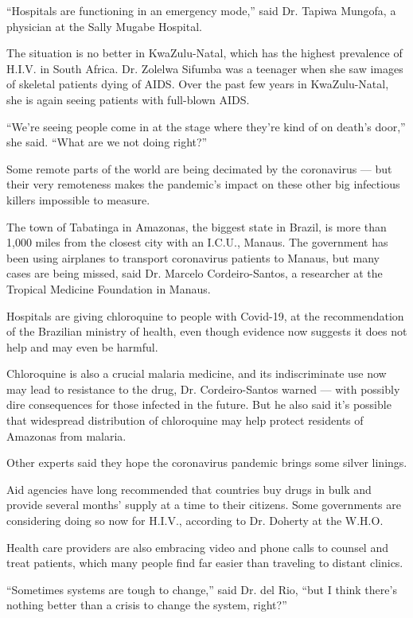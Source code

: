 ``Hospitals are functioning in an emergency mode,'' said Dr. Tapiwa
Mungofa, a physician at the Sally Mugabe Hospital.

The situation is no better in KwaZulu-Natal, which has the highest
prevalence of H.I.V. in South Africa. Dr. Zolelwa Sifumba was a teenager
when she saw images of skeletal patients dying of AIDS. Over the past
few years in KwaZulu-Natal, she is again seeing patients with full-blown
AIDS.

``We're seeing people come in at the stage where they're kind of on
death's door,'' she said. ``What are we not doing right?''

Some remote parts of the world are being decimated by the coronavirus
--- but their very remoteness makes the pandemic's impact on these other
big infectious killers impossible to measure.

The town of Tabatinga in Amazonas, the biggest state in Brazil, is more
than 1,000 miles from the closest city with an I.C.U., Manaus. The
government has been using airplanes to transport coronavirus patients to
Manaus, but many cases are being missed, said Dr. Marcelo
Cordeiro-Santos, a researcher at the Tropical Medicine Foundation in
Manaus.

Hospitals are giving chloroquine to people with Covid-19, at the
recommendation of the Brazilian ministry of health, even though evidence
now suggests it does not help and may even be harmful.

Chloroquine is also a crucial malaria medicine, and its indiscriminate
use now may lead to resistance to the drug, Dr. Cordeiro-Santos warned
--- with possibly dire consequences for those infected in the future.
But he also said it's possible that widespread distribution of
chloroquine may help protect residents of Amazonas from malaria.

Other experts said they hope the coronavirus pandemic brings some silver
linings.

Aid agencies have long recommended that countries buy drugs in bulk and
provide several months' supply at a time to their citizens. Some
governments are considering doing so now for H.I.V., according to Dr.
Doherty at the W.H.O.

Health care providers are also embracing video and phone calls to
counsel and treat patients, which many people find far easier than
traveling to distant clinics.

``Sometimes systems are tough to change,'' said Dr. del Rio, ``but I
think there's nothing better than a crisis to change the system,
right?''

